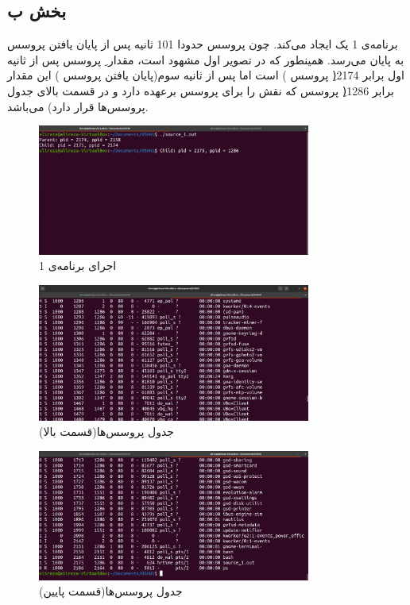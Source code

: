 \documentclass{article}
\begin{document}
\subsection{بخش ب}
\indent
برنامه‌ی 1 یک  ایجاد می‌کند. چون پروسس  حدودا 101 ثانیه پس از پایان یافتن پروسس  به پایان می‌رسد. همینطور که در تصویر اول مشهود است، مقدار ِ پروسس  پس از ثانیه اول برابر 2174(ِ پروسس ) است اما پس از ثانیه سوم(پایان یافتن پروسس ) این مقدار برابر 1286(ِ پروسس  که نقش  را برای پروسس  برعهده دارد و در قسمت بالای جدول پروسس‌ها قرار دارد) می‌باشد.
\begin{figure}[H]
    \centering
    \includegraphics[width=0.8\textwidth]{figures/6.2.1.1.png}
    \caption{اجرای برنامه‌ی 1}
    \label{fig:fig1}
\end{figure}

\begin{figure}[H]
    \centering
    \includegraphics[width=0.8\textwidth]{figures/6.2.1.3.png}
    \caption{جدول پروسس‌ها(قسمت بالا)}
    \label{fig:fig1}
\end{figure}

\begin{figure}[H]
    \centering
    \includegraphics[width=0.8\textwidth]{figures/6.2.1.2.png}
    \caption{جدول پروسس‌ها(قسمت پایین)}
    \label{fig:fig1}
\end{figure}
\end{document}
